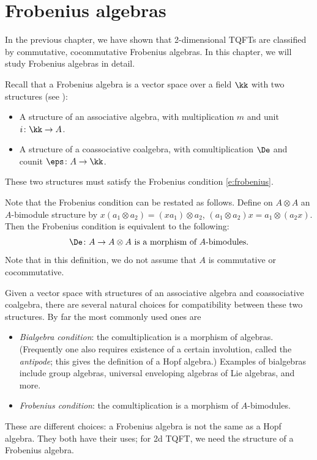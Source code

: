 \chapter{Frobenius algebras}\label{c:frobenius}


In the previous chapter, we have shown that 2-dimensional TQFTs are classified
by commutative, cocommutative Frobenius algebras. In this chapter, we will study
Frobenius algebras in detail.


Recall that a Frobenius
algebra is a vector space over a field $\kk$ with two structures (see
):
\begin{itemize}
  \item A structure of an associative algebra, with multiplication $m$ and
    unit $i\colon \kk \to A$.
  \item A structure of a coassociative coalgebra, with comultiplication $\De$
    and counit $\eps\colon A\to \kk$.
\end{itemize}
These two structures must satisfy the Frobenius condition
\eqref{e:frobenius}.

Note that the Frobenius condition can be restated as follows. Define on
$A\otimes A$ an  $A$-bimodule structure by $x (a_1\otimes a_2) = (xa_1)\otimes
a_2$, $(a_1\otimes a_2) x = a_1\otimes (a_2 x)$. Then the Frobenius condition
is equivalent to the following:
\begin{equation}\label{e:frobenius2}
  \De\colon A\to A\otimes A \text{ is a morphism of $A$-bimodules.}
\end{equation}
Note that in this definition, we do not assume that $A$ is commutative or
cocommutative.

\begin{remark}
  Given a vector space with structures of an associative algebra and
  coassociative coalgebra, there are several natural choices for
  compatibility between these two structures. By far the most commonly used
  ones are
  \begin{itemize}
    \item \emph{Bialgebra condition}:
      the comultiplication is a morphism of algebras.
      (Frequently one also requires existence of a certain involution, called
      the \emph{antipode}; this gives the definition of a Hopf
      algebra.)
      Examples of bialgebras include group algebras, universal
      enveloping algebras of  Lie algebras, and more.
    \item \emph{Frobenius condition}: the comultiplication is a morphism
      of $A$-bimodules.
  \end{itemize}
  These are different choices: a Frobenius algebra is not the same as a
  Hopf algebra. They both have their uses; for 2d TQFT, we need the
  structure of a Frobenius algebra.
\end{remark}


